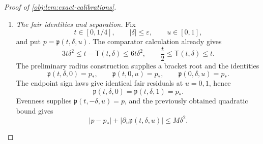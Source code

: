 \begin{proof}[Proof of \cref{obj:lem:exact-calibrations}]
\begin{enumerate}
On the axes, the zero-effect normalized formula and \(EZ_u^2=1\) reduce the residuals to
\[
\mathcal F_{\mathrm{mix}}(0,\zeta,u,\chi)
=1-4\zeta^2-\chi,
\qquad
\mathcal F_{\mathrm{mix}}(\eta,0,u,\chi)
=1-4\eta^2\chi^2-\chi.
\]
When \(|\zeta|\le1/8\), the candidate \(1-4\zeta^2\) lies strictly in \((3/4,5/4)\); the affine equation forces every selected zero to equal it. Hence
\[
\mathfrak q(0,\zeta,u)=1-4\zeta^2.
\]
For the other axis, \(\eta^2\le1/64\) gives
\[
1-4\eta^2(7/8)^2-\frac78\ge0,
\qquad
1-4\eta^2-1\le0.
\]
The intermediate value theorem supplies a zero in \([7/8,1]\), hence in the selection bracket. Substitution of the selected zero into the reduced equation proves
\[
\mathfrak q(\eta,0,u)
+4\eta^2\mathfrak q(\eta,0,u)^2=1.
\]
These arguments include \(\eta=0\) and \(\zeta=0\).

\item \emph{The fair identities and separation.}
Fix
\[
t\in[0,1/4],\qquad |\delta|\le\varepsilon,\qquad u\in[0,1],
\]
and put \(p=\mathfrak p(t,\delta,u)\). The comparator calculation already gives
\[
3t\delta^2\le t-\mathsf T(t,\delta)\le6t\delta^2,
\qquad
\frac t2\le\mathsf T(t,\delta)\le t.
\]
The preliminary radius construction supplies a bracket root and the identities
\[
\mathfrak p(t,\delta,0)=p_*,
\qquad
\mathfrak p(t,0,u)=p_*,
\qquad
\mathfrak p(0,\delta,u)=p_*.
\]
The endpoint sign laws give identical fair residuals at \(u=0,1\), hence
\[
\mathfrak p(t,\delta,0)=\mathfrak p(t,\delta,1)=p_*.
\]
Evenness supplies \(\mathfrak p(t,-\delta,u)=p\), and the previously obtained quadratic bound gives
\[
|p-p_*|+|\partial_u\mathfrak p(t,\delta,u)|
\le M\delta^2.
\]


\end{enumerate}
\end{proof}

